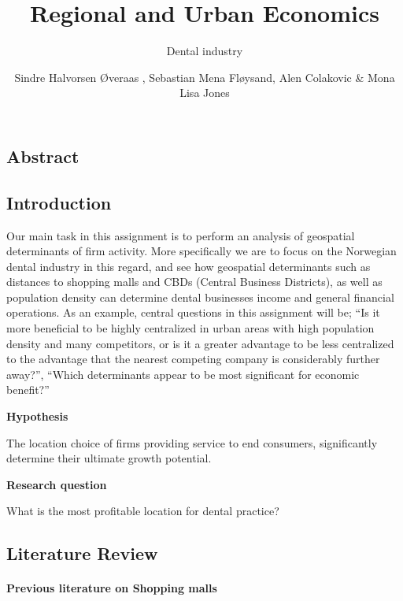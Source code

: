 \documentclass[
  10,
  a4paper,
]{article}
\title{Regional and Urban Economics}
\subtitle{Dental industry}
\author{Sindre Halvorsen Øveraas , Sebastian Mena Fløysand, Alen
Colakovic \& Mona Lisa Jones}
\date{}
\let\oldparagraph\paragraph
\renewcommand{\paragraph}[1]{\oldparagraph{#1}\mbox{}}
\begin{document}
\maketitle
\ifdefined\Shaded\renewenvironment{Shaded}{\begin{tcolorbox}[sharp corners, borderline west={3pt}{0pt}{shadecolor}, enhanced, breakable, interior hidden, frame hidden, boxrule=0pt]}{\end{tcolorbox}}\fi

\hypertarget{abstract}{%
\subsection{Abstract}\label{abstract}}

\hypertarget{introduction}{%
\subsection{Introduction}\label{introduction}}

Our main task in this assignment is to perform an analysis of geospatial
determinants of firm activity. More specifically we are to focus on the
Norwegian dental industry in this regard, and see how geospatial
determinants such as distances to shopping malls and CBDs (Central
Business Districts), as well as population density can determine dental
businesses income and general financial operations. As an example,
central questions in this assignment will be; ``Is it more beneficial to
be highly centralized in urban areas with high population density and
many competitors, or is it a greater advantage to be less centralized to
the advantage that the nearest competing company is considerably further
away?'', ``Which determinants appear to be most significant for economic
benefit?''

\textbf{Hypothesis}

The location choice of firms providing service to end consumers,
significantly determine their ultimate growth potential.

\textbf{Research question}

What is the most profitable location for dental practice?

\hypertarget{literature-review}{%
\subsection{Literature Review}\label{literature-review}}

\hypertarget{previous-literature-on-shopping-malls}{%
\paragraph{Previous literature on Shopping
malls}\label{previous-literature-on-shopping-malls}}
\end{document}
